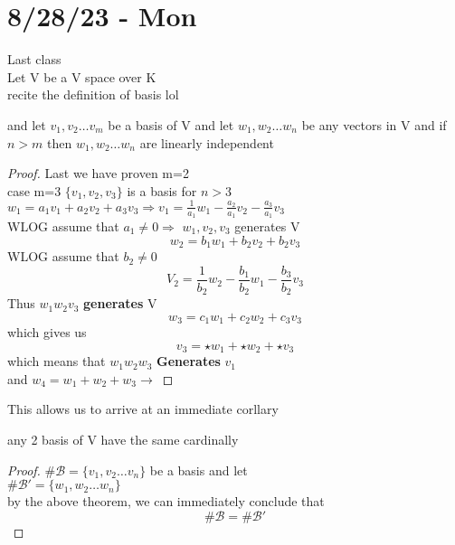\documentclass{article}
\newcommand{\vs}{v_1,v_2\dots v_n}
\newcommand{\ws}{w_1,w_2\dots w_n}
\newcommand{\brac}[1]{\{#1\}}
\newenvironment{corollary}[2][Corollary]{\begin{trivlist}
\item[\hskip \labelsep {\bfseries #1}\hskip \labelsep {\bfseries #2.}]}{\end{trivlist}}
\begin{document}
\section{8/28/23 - Mon}
Last class\\
Let V be a V space over K \\
recite the definition of basis lol
\begin{theorem}[A]
and let $v_1,v_2\dots v_m$ be a basis of V and let $\ws$   be any vectors in V and if $n>m$ then $\ws$ are linearly independent \\


\end{theorem}
\begin{proof}
    Last we have proven m=2\\
    case m=3
    $\brac{v_1,v_2,v_3}$ is a basis for $n>3$\\
    $w_1=a_1v_1+a_2v_2+a_3v_3 \Rightarrow v_1=\frac{1}{a_1}w_1-\frac{a_2}{a_1}v_2-\frac{a_3}{a_1}v_3$
    \\WLOG assume that $a_1\neq 0 \Rightarrow$ $w_1,v_2,v_3$ generates V\\
    $$w_2=b_1w_1+b_2v_2+b_2v_3$$ WLOG assume that $b_2\not=0$\\
    $$V_2=\frac{1}{b_2}w_2-\frac{b_1}{b_2}w_1-\frac{b_3}{b_2}v_3$$ Thus $w_1w_2v_3  $ \textbf{generates }V\\
    $$w_3=c_1w_1+c_2w_2+c_3v_3$$ 
    which gives us $$ v_3=\star w_1+\star w_2+\star v_3$$
    which means that $w_1w_2w_3$ \textbf{Generates } $v_1$\\
and $w_4=w_1+w_2+w_3 \to $ \lightning
    
\end{proof}

This allows us to arrive at an immediate corllary\\
\begin{corollary}
   i any 2 basis of V have the same cardinally
\end{corollary}
\begin{proof}
    $\# \mathcal{B}=\brac{\vs}$ be a basis and let \\
    $\#\mathcal{B'}=\brac{\ws}$  \\
    by the above theorem, we can immediately conclude that $$\#\mathcal{B}=\#\mathcal{B'}$$
\end{proof}
\end{document}

